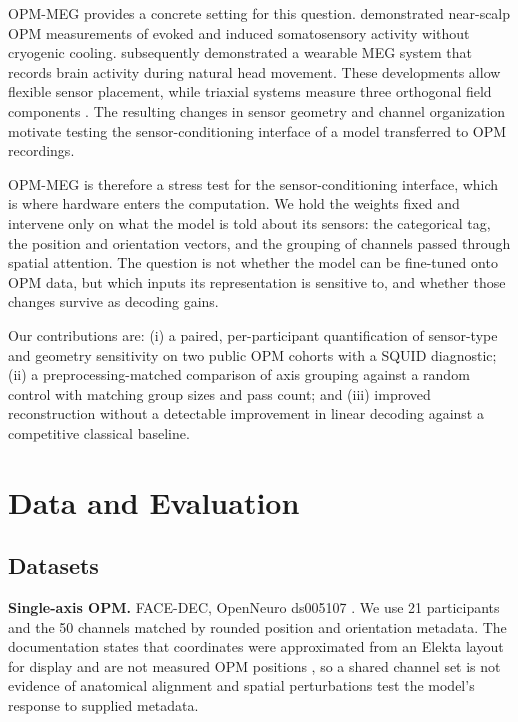 OPM-MEG provides a concrete setting for this question. \citet{boto2017opm} demonstrated near-scalp OPM measurements of evoked and induced somatosensory activity without cryogenic cooling. \citet{boto2018wearable} subsequently demonstrated a wearable MEG system that records brain activity during natural head movement. These developments allow flexible sensor placement, while triaxial systems measure three orthogonal field components \citep{rea2022triaxial}. The resulting changes in sensor geometry and channel organization motivate testing the sensor-conditioning interface of a model transferred to OPM recordings.

OPM-MEG is therefore a stress test for the sensor-conditioning interface, which is where hardware enters the computation. We hold the weights fixed and intervene only on what the model is told about its sensors: the categorical tag, the position and orientation vectors, and the grouping of channels passed through spatial attention. The question is not whether the model can be fine-tuned onto OPM data, but which inputs its representation is sensitive to, and whether those changes survive as decoding gains.

Our contributions are: (i) a paired, per-participant quantification of sensor-type and geometry sensitivity on two public OPM cohorts with a SQUID diagnostic; (ii) a preprocessing-matched comparison of axis grouping against a random control with matching group sizes and pass count; and (iii) improved reconstruction without a detectable improvement in linear decoding against a competitive classical baseline.

\section{Data and Evaluation}

\subsection{Datasets}

\textbf{Single-axis OPM.} FACE-DEC, OpenNeuro ds005107 \citep{xu2024face}. We use 21 participants and the 50 channels matched by rounded position and orientation metadata. The documentation states that coordinates were approximated from an Elekta layout for display and are not measured OPM positions \citep{facedecdocs}, so a shared channel set is not evidence of anatomical alignment and spatial perturbations test the model's response to supplied metadata.

